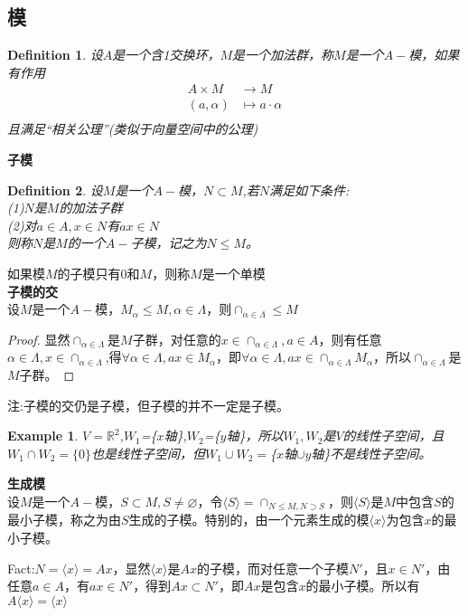 \documentclass[UTF8]{article}
\newtheorem{defn}{Definition}[section]
\newtheorem{exa}{Example}[section]
\begin{document}
\subsection{模}
\begin{defn}
	设$A$是一个含1交换环，$M$是一个加法群，称$M$是一个$A-$模，如果有作用
	\[
	\begin{split}
	A\times M&\rightarrow M\\
	(a,\alpha)&\longmapsto a·\alpha\\
	\end{split}
	\]
	且满足“相关公理”(类似于向量空间中的公理)
\end{defn}
\textbf{子模}
\begin{defn}
	设$M$是一个$A-$模，$N\subset M$,若$N$满足如下条件:\\
	(1)$N$是$M$的加法子群\\
	(2)对$a\in A,x\in N$有$ax\in N$\\
	则称$N$是$M$的一个$A-$子模，记之为$N\leq M$。
	
\end{defn}
如果模$M$的子模只有0和$M$，则称$M$是一个单模\\
\textbf{子模的交}\\
设$M$是一个$A-$模，$M_{\alpha}\leq M,\alpha\in\Lambda$，则$\cap_{\alpha\in\Lambda}\leq M$
\begin{proof}
	显然$\cap_{\alpha\in\Lambda}$是$M$子群，对任意的$x\in\cap_{\alpha\in\Lambda},a\in A$，则有任意$\alpha\in\Lambda,x\in\cap_{\alpha\in\Lambda}$,得$\forall\alpha\in\Lambda,ax\in M_{\alpha}$，即$\forall\alpha\in\Lambda,ax\in\cap_{\alpha\in\Lambda}M_{\alpha}$，所以$\cap_{\alpha\in\Lambda}$是$M$子群。
	
\end{proof}
注:子模的交仍是子模，但子模的并不一定是子模。
\begin{exa}
	$V=\mathbb R^2$,$W_1$=\{$x$轴\},$W_2$=\{$y$轴\}，所以$W_1,W_2$是$V$的线性子空间，且$W_1\cap W_2=\{0\}$也是线性子空间，但$W_1\cup W_2=$\{$x$轴$\cup y$轴\}不是线性子空间。
\end{exa}

\textbf{生成模}\\
设$M$是一个$A-$模，$S\subset M,S\neq\varnothing$，令$\langle S\rangle=\cap_{N\leq M,N\supset S}$，则$\langle S\rangle$是$M$中包含$S$的最小子模，称之为由$S$生成的子模。特别的，由一个元素生成的模$\langle x\rangle$为包含$x$的最小子模。

Fact:$N=\langle x\rangle=Ax$，显然$\langle x\rangle$是$Ax$的子模，而对任意一个子模$N'$，且$x\in N'$，由任意$a\in A$，有$ax\in N'$，得到$Ax\subset N'$，即$Ax$是包含$x$的最小子模。所以有$A\langle x\rangle=\langle x\rangle$
\end{document}
